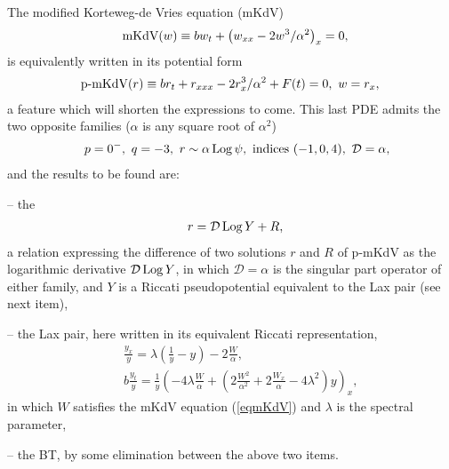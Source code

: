 \documentclass[10pt]{article}
\begin{document}
The modified Korteweg-de Vries equation (mKdV)
\begin{eqnarray}
& &
\hbox{mKdV}(w) \equiv
b w_t + \left(w_{xx} -2 w^3 / \alpha^2 \right)_x=0,\
\label{eqmKdV}
\end{eqnarray}
is equivalently written in its potential form 
\begin{eqnarray}
{\hskip -4.0 truemm}
& &
\hbox{p-mKdV}(r) \equiv
b r_t + r_{xxx} - 2 r_x^3 / \alpha^2 + F(t) = 0,\
w=r_x,
\end{eqnarray}
a feature which will shorten the expressions to come. 
This last PDE admits the two opposite families
($\alpha$ is any square root of $\alpha^2$)
\begin{eqnarray}
& &
p=0^{-},\
q=-3,\
r \sim \alpha \mathop{\rm Log}\nolimits \psi,\
\hbox{indices } (-1,0,4),\
{\mathcal D} = \alpha,
\end{eqnarray}
and the results to be found are:
\begin{description}
\item -- the \formerDT
\begin{eqnarray}
& &
r={\mathcal D} \mathop{\rm Log}\nolimits Y + R,\
\label{eqformerDT}
\end{eqnarray}
a relation expressing the difference of two solutions $r$ and $R$ 
of p-mKdV as the logarithmic derivative ${\mathcal D} \mathop{\rm Log}\nolimits Y$,
in which ${\mathcal D} = \alpha$ is the singular part operator of either
family,
and $Y$ is a Riccati pseudopotential equivalent to the Lax pair
(see next item),

\item -- the Lax pair, here written in its equivalent Riccati representation,
\begin{eqnarray}
& &
\frac{y_x}{y}
=
\lambda (\frac{1}{y} - y) - 2 \frac{W}{\alpha},\
\label{eqmKdVRiccatix}
\\
& &
b \frac{y_t}{y}
=
 \frac{1}{y} \left(
- 4 \lambda \frac{W}{\alpha}
+ (2 \frac{W^2}{\alpha^2}
+ 2 \frac{W_{x}}{\alpha}
- 4 \lambda^2) y
 \right)_x,
\label{eqmKdVRiccatit}
\end{eqnarray}
in which $W$ satisfies the mKdV equation (\ref{eqmKdV})
and $\lambda$ is the spectral parameter,

\item -- the BT, by some elimination between the above two items.

\end{description}
\end{document}
